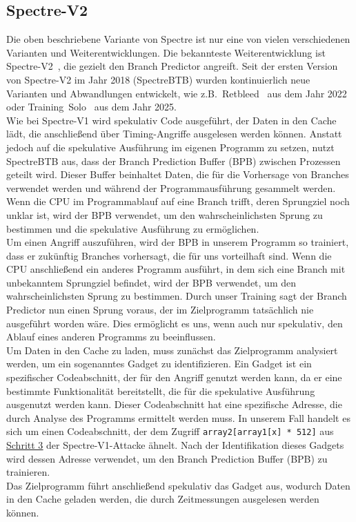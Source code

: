 \subsection{Spectre-V2}
\label{subsec:spectre_spectre-v2}
Die oben beschriebene Variante von Spectre ist nur eine von vielen verschiedenen Varianten und Weiterentwicklungen.
Die bekannteste Weiterentwicklung ist Spectre-V2~\cite{spec_v2}, die gezielt den Branch Predictor angreift.
Seit der ersten Version von Spectre-V2 im Jahr 2018 (SpectreBTB) wurden kontinuierlich neue Varianten und Abwandlungen entwickelt, wie z.B.~Retbleed~\cite{spec_v2_retbleed} aus dem Jahr 2022 oder Training~Solo~\cite{training_solo} aus dem Jahr 2025. \\
Wie bei Spectre-V1 wird spekulativ Code ausgeführt, der Daten in den Cache lädt, die anschließend über Timing-Angriffe ausgelesen werden können.
Anstatt jedoch auf die spekulative Ausführung im eigenen Programm zu setzen, nutzt SpectreBTB aus, dass der Branch Prediction Buffer (BPB) zwischen Prozessen geteilt wird.
Dieser Buffer beinhaltet Daten, die für die Vorhersage von Branches verwendet werden und während der Programmausführung gesammelt werden.
Wenn die CPU im Programmablauf auf eine Branch trifft, deren Sprungziel noch unklar ist, wird der BPB verwendet, um den wahrscheinlichsten Sprung zu bestimmen und die spekulative Ausführung zu ermöglichen. \\
Um einen Angriff auszuführen, wird der BPB in unserem Programm so trainiert, dass er zukünftig Branches vorhersagt, die für uns vorteilhaft sind.
Wenn die CPU anschließend ein anderes Programm ausführt, in dem sich eine Branch mit unbekanntem Sprungziel befindet, wird der BPB verwendet, um den wahrscheinlichsten Sprung zu bestimmen.
Durch unser Training sagt der Branch Predictor nun einen Sprung voraus, der im Zielprogramm tatsächlich nie ausgeführt worden wäre.
Dies ermöglicht es uns, wenn auch nur spekulativ, den Ablauf eines anderen Programms zu beeinflussen. \\
Um Daten in den Cache zu laden, muss zunächst das Zielprogramm analysiert werden, um ein sogenanntes Gadget zu identifizieren.
Ein Gadget ist ein spezifischer Codeabschnitt, der für den Angriff genutzt werden kann, da er eine bestimmte Funktionalität bereitstellt, die für die spekulative Ausführung ausgenutzt werden kann.
Dieser Codeabschnitt hat eine spezifische Adresse, die durch Analyse des Programms ermittelt werden muss.
In unserem Fall handelt es sich um einen Codeabschnitt, der dem Zugriff \texttt{array2[array1[x] * 512]} aus \hyperref[itm:spectre_step3_code]{\underline{Schritt 3}} der Spectre-V1-Attacke ähnelt.
Nach der Identifikation dieses Gadgets wird dessen Adresse verwendet, um den Branch Prediction Buffer (BPB) zu trainieren. \\
Das Zielprogramm führt anschließend spekulativ das Gadget aus, wodurch Daten in den Cache geladen werden, die durch Zeitmessungen ausgelesen werden können.

